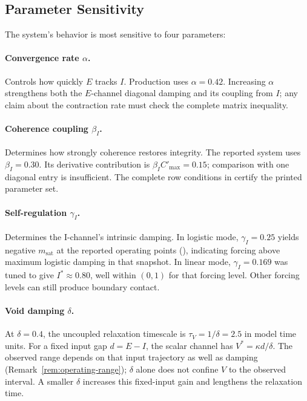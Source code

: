 \documentclass[11pt,twocolumn]{article}
\begin{document}
\subsection{Parameter Sensitivity}

The system's behavior is most sensitive to four parameters:

\paragraph{Convergence rate $\alpha$.}
Controls how quickly $E$ tracks $I$. Production uses
$\alpha = 0.42$. Increasing $\alpha$ strengthens both the
$E$-channel diagonal damping and its coupling from $I$; any claim
about the contraction rate must check the complete matrix inequality.

\paragraph{Coherence coupling $\beta_I$.}
Determines how strongly coherence restores integrity. The
reported system uses $\beta_I=0.30$. Its derivative contribution
is $\beta_I C'_{\max}=0.15$; comparison with one diagonal
entry is insufficient. The complete row conditions in
 certify the printed parameter set.

\paragraph{Self-regulation $\gamma_I$.}
Determines the I-channel's intrinsic damping. In logistic mode,
$\gamma_I = 0.25$ yields negative $m_{\text{sat}}$ at the reported
operating points (), indicating forcing
above maximum logistic damping in that snapshot. In linear mode,
$\gamma_I = 0.169$ was tuned to give $I^* \approx 0.80$, well within
$(0,1)$ for that forcing level. Other forcing levels can still
produce boundary contact.

\paragraph{Void damping $\delta$.}
At $\delta=0.4$, the uncoupled relaxation timescale is
$\tau_V=1/\delta=2.5$ in model time units. For a fixed input
gap $d=E-I$, the scalar channel has $V^*=\kappa d/\delta$.
The observed range depends on that input trajectory as well as
damping (Remark~\ref{rem:operating-range}); $\delta$ alone does
not confine $V$ to the observed interval. A smaller $\delta$
increases this fixed-input gain and lengthens the relaxation time.
\end{document}
